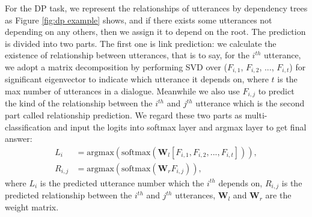 \documentclass[11pt]{article}
\begin{document}
For the DP task, we represent the relationships of utterances by dependency trees as Figure \ref{fig:dp example} shows, and if there exists some utterances not depending on any others, then we assign it to depend on the root. The prediction is divided into two parts. The first one is link prediction: we calculate the existence of relationship between utterances, that is to say, for the $i^{th}$ utterance, we adopt a matrix decomposition by performing SVD over ($F_{i,1}$, $F_{i,2}$, ..., $F_{i,t}$) for significant eigenvector to indicate which utterance it depends on, where $t$ is the max number of utterances in a dialogue. Meanwhile we also use $F_{i,j}$ to predict the kind of the relationship between the $i^{th}$ and $j^{th}$ utterance which is the second part called relationship prediction. We regard these two parts as multi-classification and input the logits into softmax layer and argmax layer to get final answer:
\begin{equation}\label{equation:link}
\begin{split}
L_i&=\textrm{argmax}(\textrm{softmax}(\boldsymbol{W}_{l}[F_{i,1}, F_{i,2}, ..., F_{i,t}])),\\
R_{i,j}&=\textrm{argmax}(\textrm{softmax}(\boldsymbol{W}_{r}F_{i,j})),
\end{split}
\end{equation}
where $L_i$ is the predicted utterance number which the $i^{th}$ depends on, $R_{i,j}$ is the predicted relationship between the $i^{th}$ and $j^{th}$ utterances, $\boldsymbol{W}_{l}$ and $\boldsymbol{W}_{r}$ are the weight matrix.
\end{document}
